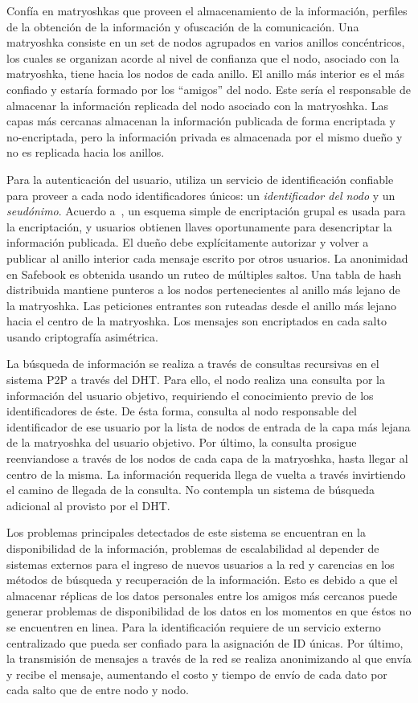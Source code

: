  Confía en matryoshkas que proveen el almacenamiento de la información, perfiles de la obtención de la información
y ofuscación de la comunicación. Una matryoshka consiste en un set de nodos
agrupados en varios anillos concéntricos, los cuales se organizan acorde al nivel de confianza que el
nodo, asociado con la matryoshka, tiene hacia los nodos de cada anillo. El
anillo más interior es el más confiado y estaría formado por los ``amigos'' del
nodo. Este sería el responsable  de almacenar la información replicada del nodo
asociado con la matryoshka. Las capas más cercanas almacenan la información
publicada de forma encriptada y no-encriptada, pero la información privada es
almacenada por el mismo dueño y no es replicada hacia los anillos. 

Para la autenticación del usuario, utiliza un servicio de identificación
confiable para proveer a cada nodo identificadores únicos: un \textit{identificador del
nodo} y un \textit{seudónimo}.
Acuerdo a~\cite{springerlink_10.1007_978-3-642-14282-6_7}, un esquema simple de encriptación grupal es usada para la
encriptación, y usuarios obtienen llaves oportunamente para desencriptar la
información publicada. El dueño debe explícitamente autorizar y volver a publicar al
anillo interior cada mensaje escrito por otros usuarios.
La anonimidad en Safebook es obtenida usando un ruteo de múltiples saltos. Una
tabla de hash distribuida mantiene punteros a los nodos pertenecientes al
anillo más lejano de la matryoshka. Las peticiones entrantes son ruteadas desde
el anillo más lejano hacia el centro de la matryoshka. Los mensajes son
encriptados en cada salto usando criptografía asimétrica.

La búsqueda de información se realiza a través de consultas recursivas en el
sistema P2P a través del DHT. Para ello, el nodo realiza una consulta
por la información del usuario objetivo, requiriendo el conocimiento previo de
los identificadores de éste. De ésta forma, consulta al nodo responsable del
identificador de ese usuario por la lista de nodos de entrada de la
capa más lejana de la matryoshka del usuario objetivo. Por último, la consulta
prosigue reenviandose a través de los nodos de cada capa de la matryoshka, hasta
llegar al centro de la misma. La información requerida llega de vuelta a través
invirtiendo el camino de llegada de la consulta.
No contempla un sistema de búsqueda adicional al provisto por el DHT.

Los problemas principales detectados de este sistema se encuentran en la
disponibilidad de la información, problemas de escalabilidad al depender de
sistemas externos para el ingreso de nuevos usuarios a la red y carencias en
los métodos de búsqueda y recuperación de la información.
Esto es debido a que el almacenar réplicas de los datos personales entre los amigos más cercanos
puede generar problemas de disponibilidad de los datos en los momentos en que
éstos no se encuentren en linea. Para la identificación requiere de un servicio
externo centralizado  que pueda ser confiado para la asignación de ID únicas.
Por último, la transmisión de mensajes a través de la red se realiza
anonimizando al que envía y recibe el mensaje, aumentando el costo y tiempo de
envío de cada dato por cada salto que de entre nodo y nodo.
